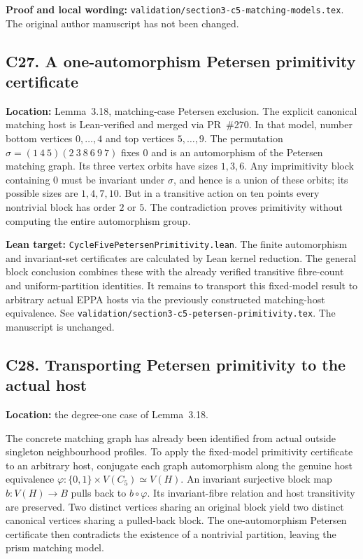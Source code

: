 \documentclass[11pt,a4paper]{article}
\begin{document}
\textbf{Proof and local wording:}
\texttt{validation/section3-c5-matching-models.tex}.
The original author manuscript has not been changed.

\subsection*{C27. A one-automorphism Petersen primitivity certificate}
\textbf{Location:} Lemma~3.18, matching-case Petersen exclusion.
The explicit canonical matching host is Lean-verified
and merged via PR~\#270.
In that model, number bottom vertices \(0,\dots,4\)
and top vertices \(5,\dots,9\).
The permutation
\(\sigma=(1\ 4\ 5)(2\ 3\ 8\ 6\ 9\ 7)\)
fixes \(0\) and is an automorphism of the
Petersen matching graph. Its three vertex orbits
have sizes \(1,3,6\). Any imprimitivity block
containing \(0\) must be invariant under \(\sigma\),
and hence is a union of these orbits; its possible
sizes are \(1,4,7,10\).
But in a transitive action on ten points every
nontrivial block has order \(2\) or \(5\).
The contradiction proves primitivity without
computing the entire automorphism group.

\textbf{Lean target:}
\texttt{CycleFivePetersenPrimitivity.lean}.
The finite automorphism and invariant-set certificates
are calculated by Lean kernel reduction.
The general block conclusion combines these
with the already verified transitive fibre-count
and uniform-partition identities.
It remains to transport this fixed-model result
to arbitrary actual EPPA hosts via the previously
constructed matching-host equivalence.
See \texttt{validation/section3-c5-petersen-primitivity.tex}.
The manuscript is unchanged.

\subsection*{C28. Transporting Petersen primitivity to the actual host}
\textbf{Location:} the degree-one case of Lemma~3.18.

The concrete matching graph has already been identified from
actual outside singleton neighbourhood profiles.
To apply the fixed-model primitivity certificate to an
arbitrary host, conjugate each graph automorphism along
the genuine host equivalence
\(\varphi:\{0,1\}\times V(C_5)\simeq V(H)\).
An invariant surjective block map \(b:V(H)\to B\)
pulls back to \(b\circ\varphi\). Its invariant-fibre
relation and host transitivity are preserved.
Two distinct vertices sharing an original block yield
two distinct canonical vertices sharing a pulled-back
block. The one-automorphism Petersen certificate then
contradicts the existence of a nontrivial partition,
leaving the prism matching model.
\end{document}
